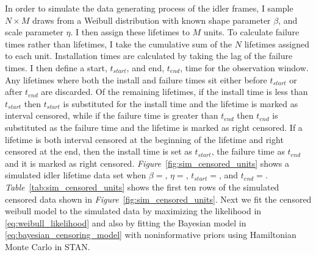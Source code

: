 In order to simulate the data generating process of the idler frames, I sample $N \times M$ draws from a Weibull distribution with known shape parameter $\beta$, and scale parameter $\eta$. I then assign these lifetimes to $M$ units. To calculate failure times rather than lifetimes, I take the cumulative sum of the $N$ lifetimes assigned to each unit. Installation times are calculated by taking the lag of the failure times. I then define a start, $t_{start}$, and end, $t_{end}$, time for the observation window. Any lifetimes where both the install and failure times sit either before $t_{start}$ or after $t_{end}$ are discarded. Of the remaining lifetimes, if the install time is less than $t_{start}$ then $t_{start}$ is substituted for the install time and the lifetime is marked as interval censored, while if the failure time is greater than $t_{end}$ then $t_{end}$ is substituted as the failure time and the lifetime is marked as right censored. If a lifetime is both interval censored at the beginning of the lifetime and right censored at the end, then the install time is set as $t_{start}$, the failure time as $t_{end}$ and it is marked as right censored. \textit{Figure}~\ref{fig:sim_censored_units} shows a simulated idler lifetime data set when $\beta = $, $\eta = $, $t_{start} = $, and $t_{end} = $. \textit{Table}~\ref{tab:sim_censored_units} shows the first ten rows of the simulated censored data shown in \textit{Figure}~\ref{fig:sim_censored_units}. Next we fit the censored weibull model to the simulated data by maximizing the likelihood in \ref{eq:weibull_likelihood} and also by fitting the Bayesian model in \ref{eq:bayesian_censoring_model} with noninformative priors using Hamiltonian Monte Carlo in STAN.

